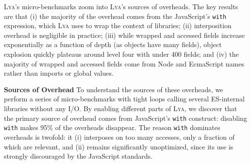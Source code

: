 \documentclass[letterpaper,twocolumn,10pt]{article}
\newcommand{\heading}[1]{\vspace{2pt}\noindent\textbf{#1}\enspace}
\newcommand{\ttt}[1]{\texttt{#1}}
\newcommand{\sx}[1]{(\S\ref{#1})}
\newcommand{\sys}{{\scshape Lya}\xspace}
\newcommand{\TODO}[1]{\hl{\textbf{TODO:} #1}\xspace}
\begin{document}
\sys's micro-benchmarks zoom into \sys's sources of overheads.
The key results are that
  (i) the majority of the overhead comes from the JavaScript's \ttt{with} expression, which \sys uses to wrap the context of libraries;
  (ii) interposition overhead is negligible in practice;
  (iii) while wrapped and accessed fields increase exponentially as a function of depth (as objects have many fields), object explosion quickly plateaus around level four with under 400 fields; and
  (iv) the majority of wrapped and accessed fields come from Node and EcmaScript names rather than imports or global values.


\heading{Sources of Overhead}
To understand the sources of these overheads, we perform a series of micro-benchmarks with tight loops calling several ES-internal libraries without any I/O.
By enabling different parts of \sys, we discover that the primary source of overhead comes from JavaScript's \ttt{with} construct:
  disabling \ttt{with} makes 95\% of the overheads disappear.
The reason \ttt{with} dominates overheads is twofold: it (i) interposes on too many accesses, only a fraction of which are relevant, and (ii) remains significantly unoptimized, since its use is strongly discouraged by the JavaScript standards.
\end{document}
